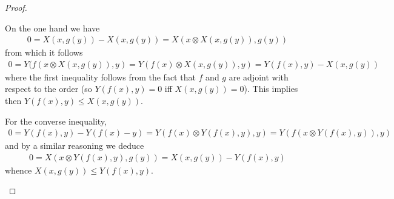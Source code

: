 \begin{proof}
\begin{itemize}
On the one hand we have 
\begin{align*}
0 = X(x, g(y))-X(x,g(y))= X(x\otimes X(x,g(y)), g(y))
\end{align*}
from which it follows
\begin{align*}
0= Y(f(x\otimes X(x,g(y)), y)=Y(f(x)\otimes X(x,g(y)), y)=
Y(f(x),y)-X(x,g(y))
\end{align*}
where the first inequality follows from the fact that $f$ and $g$ are adjoint with respect to the order (so $Y(f(x),y)=0$ iff $X(x,g(y))=0$).
This implies then $Y(f(x),y)\leq X(x,g(y))$. 

For the converse inequality, 
\begin{align*}
0=Y(f(x),y)-Y(f(x)-y)=Y(f(x)\otimes Y(f(x),y),y)=
Y(f(x\otimes Y(f(x),y)),y)
\end{align*}
and by a similar reasoning we deduce
\begin{align*}
0=X(x\otimes Y(f(x),y), g(y))=
X(x,g(y))-Y(f(x),y)
\end{align*}
whence $X(x,g(y))\leq Y(f(x),y)$.
\end{itemize}
\end{proof}


